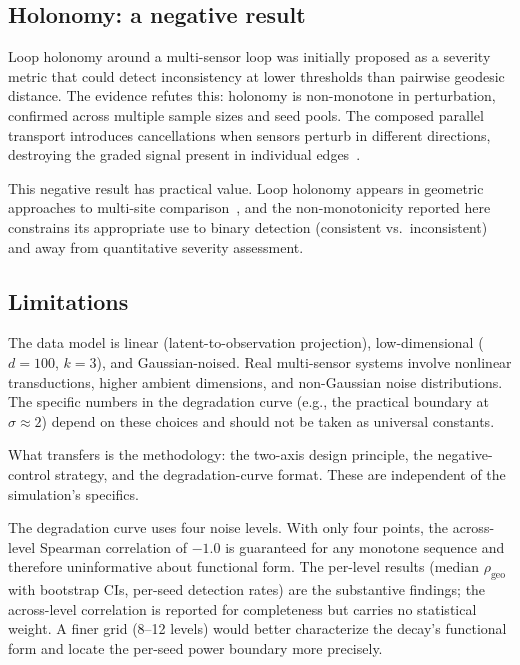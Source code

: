 \documentclass[11pt]{article}
\newcommand{\rhogeo}{\rho_\mathrm{geo}}
\begin{document}
\subsection{Holonomy: a negative result}

Loop holonomy around a multi-sensor loop was initially proposed as
a severity metric that could detect inconsistency at lower
thresholds than pairwise geodesic distance.  The evidence refutes
this: holonomy is non-monotone in perturbation, confirmed across
multiple sample sizes and seed pools.  The composed parallel
transport introduces cancellations when sensors perturb in
different directions, destroying the graded signal present in
individual edges~\citep{absil2008optimization}.

This negative result has practical value.  Loop holonomy appears in
geometric approaches to multi-site
comparison~\citep{bendokat2024grassmann}, and the non-monotonicity
reported here constrains its appropriate use to binary detection
(consistent vs.\ inconsistent) and away from quantitative severity
assessment.

\subsection{Limitations}

The data model is linear (latent-to-observation projection),
low-dimensional ($d = 100$, $k = 3$), and Gaussian-noised.  Real
multi-sensor systems involve nonlinear transductions, higher
ambient dimensions, and non-Gaussian noise distributions.  The
specific numbers in the degradation curve (e.g., the practical
boundary at $\sigma \approx 2$) depend on these choices and should
not be taken as universal constants.

What transfers is the methodology: the two-axis design principle,
the negative-control strategy, and the degradation-curve format.
These are independent of the simulation's specifics.

The degradation curve uses four noise levels.  With only four
points, the across-level Spearman correlation of $-1.0$ is
guaranteed for any monotone sequence and therefore
uninformative about functional form.  The per-level results
(median $\rhogeo$ with bootstrap CIs, per-seed detection rates)
are the substantive findings; the across-level correlation is
reported for completeness but carries no statistical weight.  A
finer grid (8--12 levels) would better characterize the decay's
functional form and locate the per-seed power boundary more
precisely.
\end{document}

